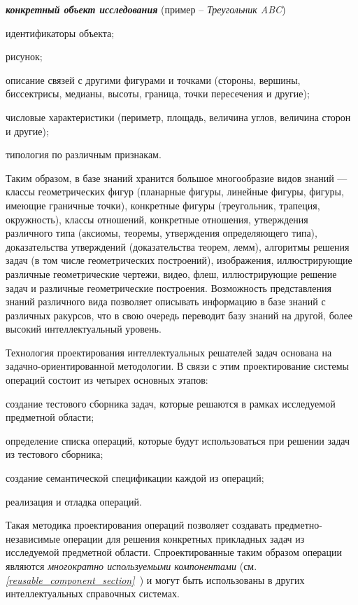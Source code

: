 \textbf{\textit{конкретный объект исследования}} (пример -- \textit{Треугольник ABC})

\begin{textitemize}
	\item идентификаторы объекта;
	\item рисунок;
	\item описание связей с другими фигурами и точками (стороны, вершины, биссектрисы, медианы, высоты, граница, точки пересечения и другие);
	\item числовые характеристики (периметр, площадь, величина углов, величина сторон и другие);
	\item типология по различным признакам.
\end{textitemize}

Таким образом, в базе знаний хранится большое многообразие видов знаний --- классы геометрических фигур (планарные фигуры, линейные фигуры, фигуры, имеющие граничные точки), конкретные фигуры (треугольник, трапеция, окружность), классы отношений, конкретные отношения, утверждения различного типа (аксиомы, теоремы, утверждения определяющего типа), доказательства утверждений (доказательства теорем, лемм), алгоритмы решения задач (в том числе геометрических построений), изображения, иллюстрирующие различные геометрические чертежи, видео, флеш, иллюстрирующие решение задач и различные геометрические построения. Возможность представления знаний различного вида позволяет описывать информацию в базе знаний с различных ракурсов, что в свою очередь переводит базу знаний на другой, более высокий интеллектуальный уровень.

Технология проектирования интеллектуальных решателей задач основана на задачно-ориентированной методологии. В связи с этим проектирование системы операций состоит из четырех основных этапов:

\begin{textitemize}
	\item создание тестового сборника задач, которые решаются в рамках исследуемой предметной области;
	\item определение списка операций, которые будут использоваться при решении задач из тестового сборника;
	\item создание семантической спецификации каждой из операций;
	\item реализация и отладка операций.
\end{textitemize}

Такая методика проектирования операций позволяет создавать предметно-независимые операции для решения конкретных прикладных задач из исследуемой предметной области. Спроектированные таким образом операции являются \textit{многократно используемыми компонентами} (см. \textit{\ref{reusable_component_section}~}) и могут быть использованы в других интеллектуальных справочных системах.

